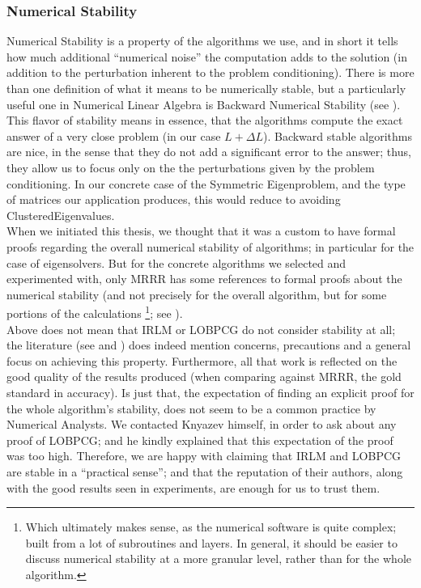 \subsubsection{Numerical Stability}

Numerical Stability is a property of the algorithms we use, and in
short it tells how much additional ``numerical noise'' the computation
adds to the solution (in addition to the perturbation inherent to the
problem conditioning). There is more than one definition of what it
means to be numerically stable, but a particularly useful one in Numerical
Linear Algebra is Backward Numerical Stability (see \cite{bindel09}). This
flavor of stability means
in essence, that the algorithms compute the exact answer of a very
close problem (in our case $L + \Delta L$). Backward stable algorithms are 
nice, in the sense that they do not add a significant error to the
answer; thus, they allow us to focus only on the
the perturbations given by the problem conditioning. In our concrete
case of the Symmetric Eigenproblem, and the type of matrices our
application produces, this would reduce to avoiding
\gls{ClusteredEigenvalues}. \\

When we initiated this thesis, we thought that it was a custom to have
formal proofs regarding the overall numerical stability of algorithms;
in particular for the case  of eigensolvers. But for the concrete
algorithms we selected and experimented with, only \gls{MRRR} has some
references to formal proofs about the numerical stability (and not
precisely for the overall algorithm, but for some portions of the
calculations \footnote{Which ultimately makes sense, as the numerical
software is quite complex; built from a lot of subroutines and
layers. In general, it should be easier to discuss numerical stability
at a more granular level, rather than for the whole algorithm.}; see
\cite{dhillon06}). \\   

Above does not mean that \gls{IRLM} or \gls{LOBPCG} do not consider
stability at all; the literature (see \cite{arpack} and
\cite{knyazev01}) does indeed mention concerns, precautions and 
a general focus on achieving this property. Furthermore, all that
work is reflected on the good quality of the results produced (when
comparing against \gls{MRRR}, the gold standard in accuracy). Is just
that, the expectation of finding an explicit proof for the whole
algorithm's stability, does not seem to be a
common practice by Numerical Analysts. We contacted Knyazev
himself, in order to ask about any proof of \gls{LOBPCG}; and he
kindly explained that this expectation of the proof was too
high. Therefore, we are happy with claiming that
\gls{IRLM} and \gls{LOBPCG} are stable in a ``practical sense'';
and that the reputation of their authors, along with the good results
seen in experiments, are enough for us to trust them.

